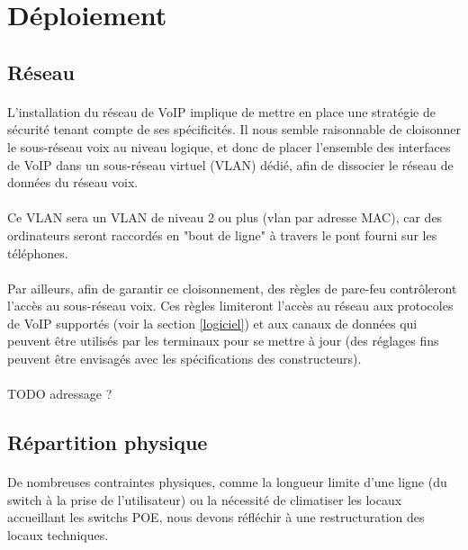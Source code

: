 \section{Déploiement}

\subsection{Réseau}

\paragraph{} L'installation du réseau de VoIP implique de mettre en place une
stratégie de sécurité tenant compte de ses spécificités. Il nous semble
raisonnable de cloisonner le sous-réseau voix au niveau logique, et donc de
placer l'ensemble des interfaces de VoIP dans un sous-réseau virtuel (VLAN)
dédié, afin de dissocier le réseau de données du réseau voix.

\paragraph{} Ce VLAN sera un VLAN de niveau 2 ou plus (vlan par adresse MAC),
car des ordinateurs seront raccordés en "bout de ligne" à travers le pont fourni
sur les téléphones.

\paragraph{} Par ailleurs, afin de garantir ce cloisonnement, des règles de
pare-feu contrôleront l'accès au sous-réseau voix. Ces règles limiteront
l'accès au réseau aux protocoles de VoIP supportés (voir la section
\ref{logiciel}) et aux canaux de données qui peuvent être utilisés par les
terminaux pour se mettre à jour (des réglages fins peuvent être envisagés avec
les spécifications des constructeurs).

\paragraph{} TODO adressage ?

\subsection{Répartition physique}

\paragraph{} De nombreuses contraintes physiques, comme la longueur limite d'une
ligne (du switch à la prise de l'utilisateur) ou la nécessité de climatiser les
locaux accueillant les switchs \ac{POE}, nous devons réfléchir à une
restructuration des locaux techniques.

